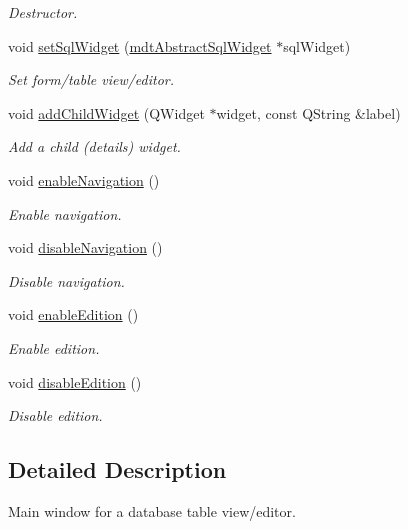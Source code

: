 \begin{DoxyCompactItemize}
\begin{DoxyCompactList}\small\item\em Destructor. \end{DoxyCompactList}\item 
void \hyperlink{classmdt_sql_window_old_aa77972aa139311b6ba5c717873afd2a5}{setSqlWidget} (\hyperlink{classmdt_abstract_sql_widget}{mdtAbstractSqlWidget} $\ast$sqlWidget)
\begin{DoxyCompactList}\small\item\em Set form/table view/editor. \end{DoxyCompactList}\item 
void \hyperlink{classmdt_sql_window_old_a4638d6ecc9ac7bc9af922c623d412846}{addChildWidget} (QWidget $\ast$widget, const QString \&label)
\begin{DoxyCompactList}\small\item\em Add a child (details) widget. \end{DoxyCompactList}\item 
void \hyperlink{classmdt_sql_window_old_a270a09e3a2a370320bfbcc844b02cddc}{enableNavigation} ()
\begin{DoxyCompactList}\small\item\em Enable navigation. \end{DoxyCompactList}\item 
void \hyperlink{classmdt_sql_window_old_a5c1dd39dcead4e1f44e7c59c567caaeb}{disableNavigation} ()
\begin{DoxyCompactList}\small\item\em Disable navigation. \end{DoxyCompactList}\item 
void \hyperlink{classmdt_sql_window_old_a6bca9d2b8f8250baaa97f70c0974edf4}{enableEdition} ()
\begin{DoxyCompactList}\small\item\em Enable edition. \end{DoxyCompactList}\item 
void \hyperlink{classmdt_sql_window_old_a2945fb8061c851907d422e0c847148da}{disableEdition} ()
\begin{DoxyCompactList}\small\item\em Disable edition. \end{DoxyCompactList}\end{DoxyCompactItemize}


\subsection{Detailed Description}
Main window for a database table view/editor. 

